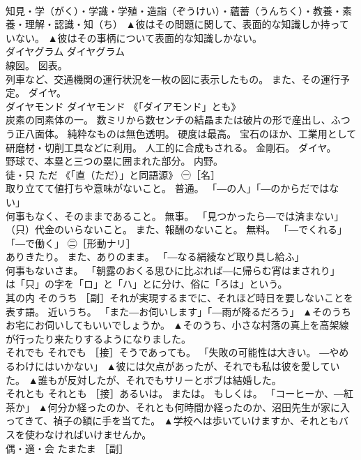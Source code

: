 \documentclass[8pt]{extreport}
\begin{document}
\begin{CJK}{UTF8}{min}
\\	知見・学（がく）・学識・学殖・造詣（ぞうけい）・蘊蓄（うんちく）・教養・素養・理解・認識・知（ち）	▲彼はその問題に関して、表面的な知識しか持っていない。 ▲彼はその事柄について表面的な知識しかない。
\\	ダイヤグラム	ダイヤグラム	
\\	線図。 図表。 
\\	列車など、交通機関の運行状況を一枚の図に表示したもの。 また、その運行予定。 ダイヤ。	
\\	ダイヤモンド	ダイヤモンド	《「ダイアモンド」とも》 
\\	炭素の同素体の一。 数ミリから数センチの結晶または破片の形で産出し、ふつう正八面体。 純粋なものは無色透明。 硬度は最高。 宝石のほか、工業用として研磨材・切削工具などに利用。 人工的に合成もされる。 金剛石。 ダイヤ。 
\\	野球で、本塁と三つの塁に囲まれた部分。 内野。	
\\	徒・只	ただ	《「直（ただ）」と同語源》 ㊀［名］ 
\\	取り立てて値打ちや意味がないこと。 普通。 「―の人」「―のからだではない」 
\\	何事もなく、そのままであること。 無事。 「見つかったら―では済まない」 
\\	（只）代金のいらないこと。 また、報酬のないこと。 無料。 「―でくれる」「―で働く」 ㊁［形動ナリ］ 
\\	ありきたり。 また、ありのまま。 「―なる絹綾など取り具し給ふ」 
\\	何事もないさま。 「朝露のおくる思ひに比ぶれば―に帰らむ宵はまされり」 
\\	は「只」の字を「ロ」と「ハ」とに分け、俗に「ろは」という。	
\\	其の内	そのうち	［副］それが実現するまでに、それほど時日を要しないことを表す語。 近いうち。 「また―お伺いします」「―雨が降るだろう」	▲そのうちお宅にお伺いしてもいいでしょうか。 ▲そのうち、小さな村落の真上を高架線が行ったり来たりするようになりました。
\\	それでも	それでも	［接］そうであっても。 「失敗の可能性は大きい。 ―やめるわけにはいかない」	▲彼には欠点があったが、それでも私は彼を愛していた。 ▲誰もが反対したが、それでもサリーとボブは結婚した。
\\	それとも	それとも	［接］あるいは。 または。 もしくは。 「コーヒーか、―紅茶か」	▲何分か経ったのか、それとも何時間か経ったのか、沼田先生が家に入ってきて、禎子の額に手を当てた。 ▲学校へは歩いていけますか、それともバスを使わなければいけませんか。
\\	偶・適・会	たまたま	［副］ 

\end{CJK}
\end{document}
